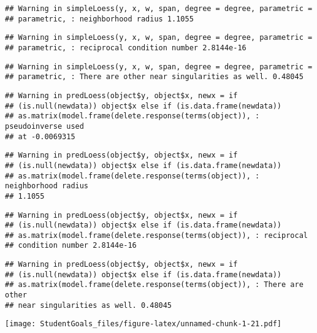 \documentclass[]{article}
\begin{document}
\begin{verbatim}
## Warning in simpleLoess(y, x, w, span, degree = degree, parametric =
## parametric, : neighborhood radius 1.1055
\end{verbatim}

\begin{verbatim}
## Warning in simpleLoess(y, x, w, span, degree = degree, parametric =
## parametric, : reciprocal condition number 2.8144e-16
\end{verbatim}

\begin{verbatim}
## Warning in simpleLoess(y, x, w, span, degree = degree, parametric =
## parametric, : There are other near singularities as well. 0.48045
\end{verbatim}

\begin{verbatim}
## Warning in predLoess(object$y, object$x, newx = if
## (is.null(newdata)) object$x else if (is.data.frame(newdata))
## as.matrix(model.frame(delete.response(terms(object)), : pseudoinverse used
## at -0.0069315
\end{verbatim}

\begin{verbatim}
## Warning in predLoess(object$y, object$x, newx = if
## (is.null(newdata)) object$x else if (is.data.frame(newdata))
## as.matrix(model.frame(delete.response(terms(object)), : neighborhood radius
## 1.1055
\end{verbatim}

\begin{verbatim}
## Warning in predLoess(object$y, object$x, newx = if
## (is.null(newdata)) object$x else if (is.data.frame(newdata))
## as.matrix(model.frame(delete.response(terms(object)), : reciprocal
## condition number 2.8144e-16
\end{verbatim}

\begin{verbatim}
## Warning in predLoess(object$y, object$x, newx = if
## (is.null(newdata)) object$x else if (is.data.frame(newdata))
## as.matrix(model.frame(delete.response(terms(object)), : There are other
## near singularities as well. 0.48045
\end{verbatim}

\texttt{[image: StudentGoals\_files/figure-latex/unnamed-chunk-1-21.pdf]}
\end{document}
